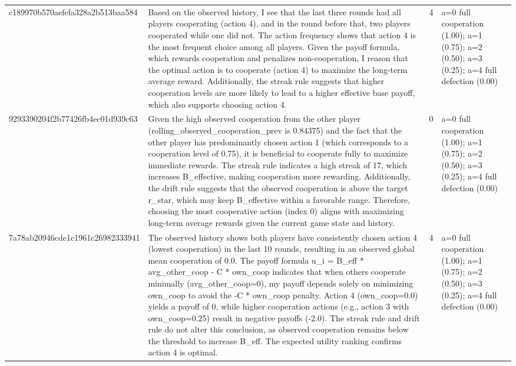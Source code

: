 \begin{tabular}{lp{8cm}ll l}
c189970b570aefefa328a2b513baa584 & Based on the observed history, I see that the last three rounds had all players cooperating (action 4), and in the round before that, two players cooperated while one did not. The action frequency shows that action 4 is the most frequent choice among all players. Given the payoff formula, which rewards cooperation and penalizes non-cooperation, I reason that the optimal action is to cooperate (action 4) to maximize the long-term average reward. Additionally, the streak rule suggests that higher cooperation levels are more likely to lead to a higher effective base payoff, which also supports choosing action 4. & 4 & a=0 full cooperation (1.00); a=1 (0.75); a=2 (0.50); a=3 (0.25); a=4 full defection (0.00) &  \\
9293390204f2b77426fb4ec01d939c63 & Given the high observed cooperation from the other player (rolling\_observed\_cooperation\_prev is 0.84375) and the fact that the other player has predominantly chosen action 1 (which corresponds to a cooperation level of 0.75), it is beneficial to cooperate fully to maximize immediate rewards. The streak rule indicates a high streak of 17, which increases B\_effective, making cooperation more rewarding. Additionally, the drift rule suggests that the observed cooperation is above the target r\_star, which may keep B\_effective within a favorable range. Therefore, choosing the most cooperative action (index 0) aligns with maximizing long-term average rewards given the current game state and history. & 0 & a=0 full cooperation (1.00); a=1 (0.75); a=2 (0.50); a=3 (0.25); a=4 full defection (0.00) &  \\
7a78ab20946cde1c1961c26982333941 & The observed history shows both players have consistently chosen action 4 (lowest cooperation) in the last 10 rounds, resulting in an observed global mean cooperation of 0.0. The payoff formula u\_i = B\_eff * avg\_other\_coop - C * own\_coop indicates that when others cooperate minimally (avg\_other\_coop=0), my payoff depends solely on minimizing own\_coop to avoid the -C * own\_coop penalty. Action 4 (own\_coop=0.0) yields a payoff of 0, while higher cooperation actions (e.g., action 3 with own\_coop=0.25) result in negative payoffs (-2.0). The streak rule and drift rule do not alter this conclusion, as observed cooperation remains below the threshold to increase B\_eff. The expected utility ranking confirms action 4 is optimal. & 4 & a=0 full cooperation (1.00); a=1 (0.75); a=2 (0.50); a=3 (0.25); a=4 full defection (0.00) &  \\

\end{tabular}
